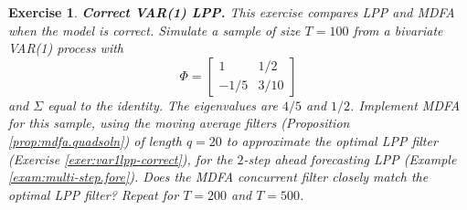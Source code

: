 \documentclass[a4paper]{book}
\newtheorem{Exercise}{Exercise}
\begin{document}
\begin{Exercise} {\bf Correct VAR(1) LPP.} \rm
\label{exer:var1lpp-correct.2}
 This exercise compares LPP and MDFA when the model is correct.
 Simulate a sample of size $T=100$ from a
  bivariate VAR(1) process with 
\[
  \Phi = \left[ \begin{array}{cc} 1 & 1/2 \\ -1/5 & 3/10 \end{array} \right]
\]
 and $\Sigma$ equal to the identity.  The eigenvalues are $4/5$ and $1/2$.
  Implement MDFA for this sample, using the moving average filters
 (Proposition \ref{prop:mdfa.quadsoln}) of length $q = 20$ to approximate the optimal
 LPP filter (Exercise \ref{exer:var1lpp-correct}), for the $2$-step
 ahead forecasting LPP (Example \ref{exam:multi-step.fore}). 
  Does the MDFA concurrent filter closely
 match the optimal LPP filter?  Repeat for $T=200$ and $T=500$.
\end{Exercise}
\end{document}
